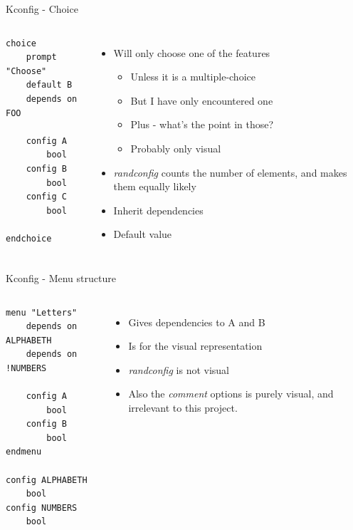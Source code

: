 \documentclass[mathserif,serif]{beamer}
\newenvironment{items}{
\begin{itemize}
  \setlength{\itemsep}{0pt}
  \setlength{\parskip}{7pt}
  \setlength{\parsep}{4pt}
}{\end{itemize}}
\begin{document}
\begin{frame}[t,fragile]{Kconfig - Choice}

    \begin{columns}[T]

    \begin{lstlisting}
choice
    prompt "Choose"
    default B
    depends on FOO

    config A
        bool
    config B
        bool
    config C
        bool

endchoice    
    \end{lstlisting}


    \begin{items}
        \item Will only choose one of the features
        \begin{items}
            \item Unless it is a multiple-choice
            \item But I have only encountered one
            \item Plus - what's the point in those?
            \item Probably only visual
        \end{items}
        \item \emph{randconfig} counts the number of elements, and makes them 
                equally likely
        \item Inherit dependencies
        \item Default value
    \end{items}

    \end{columns}
\end{frame}

\begin{frame}[t,fragile]{Kconfig - Menu structure}

    \begin{columns}[T]

    \begin{lstlisting}
menu "Letters"
    depends on ALPHABETH
    depends on !NUMBERS

    config A
        bool
    config B
        bool
endmenu

config ALPHABETH
    bool
config NUMBERS
    bool
    \end{lstlisting}


    \begin{items}
        \item Gives dependencies to A and B
        \item Is for the visual representation
        \item \emph{randconfig} is not visual
        \item Also the \emph{comment} options is purely visual, and irrelevant to
                this project.
    \end{items}

    \end{columns}
\end{frame}
\end{document}
